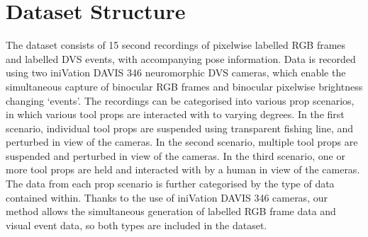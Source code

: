\documentclass{article}
\begin{document}
\section{Dataset Structure}
The dataset consists of 15 second recordings of pixelwise labelled RGB frames and labelled DVS events, with accompanying pose information. Data is recorded using two iniVation DAVIS 346 neuromorphic DVS cameras, which enable the simultaneous capture of binocular RGB frames and binocular pixelwise brightness changing `events'. The recordings can be categorised into various prop scenarios, in which various tool props are interacted with to varying degrees. In the first scenario, individual tool props are suspended using transparent fishing line, and perturbed in view of the cameras. In the second scenario, multiple tool props are suspended and perturbed in view of the cameras. In the third scenario, one or more tool props are held and interacted with by a human in view of the cameras. The data from each prop scenario is further categorised by the type of data contained within. Thanks to the use of iniVation DAVIS 346 cameras, our method allows the simultaneous generation of labelled RGB frame data and visual event data, so both types are included in the dataset.
\end{document}
